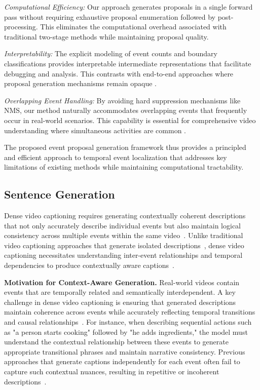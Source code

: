 \textit{Computational Efficiency:} Our approach generates proposals in a single forward pass without requiring exhaustive proposal enumeration followed by post-processing. This eliminates the computational overhead associated with traditional two-stage methods \cite{buch2017sst, lin2018bsn} while maintaining proposal quality.

\textit{Interpretability:} The explicit modeling of event counts and boundary classifications provides interpretable intermediate representations that facilitate debugging and analysis. This contrasts with end-to-end approaches where proposal generation mechanisms remain opaque \cite{Zhou2018-zu}.

\textit{Overlapping Event Handling:} By avoiding hard suppression mechanisms like NMS, our method naturally accommodates overlapping events that frequently occur in real-world scenarios. This capability is essential for comprehensive video understanding where simultaneous activities are common \cite{Duan2018-qf}.

The proposed event proposal generation framework thus provides a principled and efficient approach to temporal event localization that addresses key limitations of existing methods while maintaining computational tractability.

\subsection{Sentence Generation}
Dense video captioning requires generating contextually coherent descriptions that not only accurately describe individual events but also maintain logical consistency across multiple events within the same video~\cite{Krishna2017-pw}. Unlike traditional video captioning approaches that generate isolated descriptions~\cite{venugopalan2015sequence,venugopalan2015translating}, dense video captioning necessitates understanding inter-event relationships and temporal dependencies to produce contextually aware captions~\cite{yu2016video,lei2020mart}.

\textbf{Motivation for Context-Aware Generation.}
Real-world videos contain events that are temporally related and semantically interdependent. A key challenge in dense video captioning is ensuring that generated descriptions maintain coherence across events while accurately reflecting temporal transitions and causal relationships~\cite{xiong2018move}. For instance, when describing sequential actions such as "a person starts cooking" followed by "he adds ingredients," the model must understand the contextual relationship between these events to generate appropriate transitional phrases and maintain narrative consistency. Previous approaches that generate captions independently for each event often fail to capture such contextual nuances, resulting in repetitive or incoherent descriptions~\cite{mun2019streamlined}.

